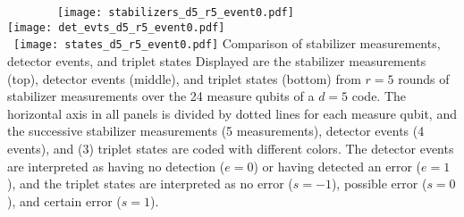 \begin{figure*}[htb]
\centering
~~~~~~~~\texttt{[image: stabilizers\_d5\_r5\_event0.pdf]} \\
\texttt{[image: det\_evts\_d5\_r5\_event0.pdf]} \\
~\texttt{[image: states\_d5\_r5\_event0.pdf]}
\ccaption
{Comparison of stabilizer measurements, detector events, and triplet states}
{
Displayed are the stabilizer measurements (top), detector events (middle), and triplet states (bottom) from $r=5$ rounds of stabilizer measurements over the 24 measure qubits of a $d=5$ code. The horizontal axis in all panels is divided by dotted lines for each measure qubit, and the successive stabilizer measurements (5 measurements), detector events (4  events), and (3) triplet states are coded with different colors. The detector events are interpreted as having no detection ($e=0$) or having detected an error ($e=1$), and the triplet states are interpreted as no error ($s=-1$), possible error ($s=0$), and certain error ($s=1$).
}
\label{fig:d5r5states}
\end{figure*}

